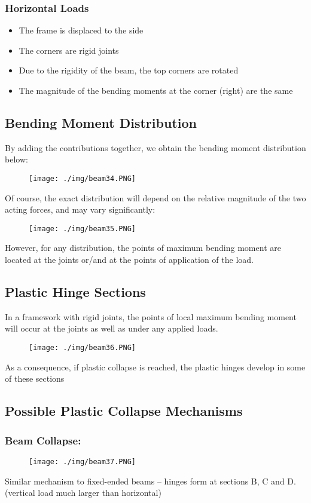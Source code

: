 \subsubsection{Horizontal Loads}
\begin{itemize}
  \item The frame is displaced to the side
  \item The corners are rigid joints
  \item Due to the rigidity of the beam, the top corners are rotated
  \item The magnitude of the bending moments at the corner (right) are the same
\end{itemize}
\subsection{Bending Moment Distribution}
By adding the contributions together, we obtain the bending moment distribution below:
\begin{figure}[H]
  \centering
  \texttt{[image: ./img/beam34.PNG]}
\end{figure}
Of course, the exact distribution will depend on the relative magnitude of the two acting forces, and may vary significantly:
\begin{figure}[H]
  \centering
  \texttt{[image: ./img/beam35.PNG]}
\end{figure}
However, for any distribution, the points of maximum bending moment are located at the joints or/and at the points of application of the load.
\subsection{Plastic Hinge Sections}
In a framework with rigid joints, the points of local maximum bending moment will occur at the joints as well as under any applied loads.
\begin{figure}[H]
  \centering
  \texttt{[image: ./img/beam36.PNG]}
\end{figure}
As a consequence, if plastic collapse is reached, the plastic hinges develop in some of these sections
\subsection{Possible Plastic Collapse Mechanisms}
\subsubsection{Beam Collapse:}
\begin{figure}[H]
  \centering
  \texttt{[image: ./img/beam37.PNG]}
\end{figure}
Similar mechanism to fixed-ended beams – hinges form at sections B, C and D. (vertical load much larger than horizontal)
